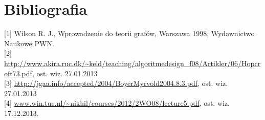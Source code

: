 \documentclass[a4 122pt]{article}
\begin{document}
\pagebreak
\section{Bibliografia}

	[1]	Wilson R. J., Wprowadzenie do teorii grafów, Warszawa 1998, Wydawnictwo Naukowe PWN.\\[0.3cm]
	[2]	\url{http://www.akira.ruc.dk/~keld/teaching/algoritmedesign\_f08/Artikler/06/Hopcroft73.pdf}, ost. wiz. 27.01.2013\\[0.3cm] 
	[3]	\url{http://jgaa.info/accepted/2004/BoyerMyrvold2004.8.3.pdf}, ost. wiz. 27.01.2013 \\[0.3cm]
	[4]	\url{www.win.tue.nl/~nikhil/courses/2012/2WO08/lecture5.pdf}, ost. wiz. 17.12.2013.\\[0.3cm]
\end{document}
